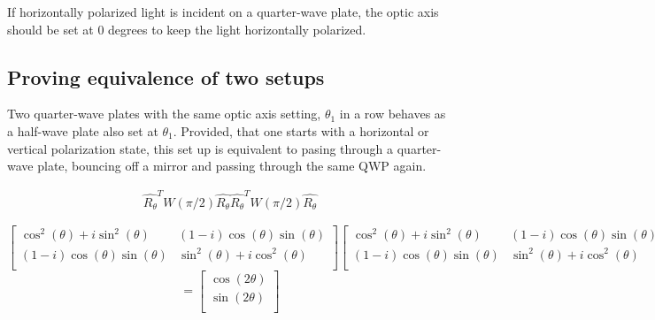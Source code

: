 \documentclass{article}
\begin{document}
\hspace{\parindent} If horizontally polarized light is incident on a quarter-wave plate, the optic axis should be set at 0 degrees to keep the light horizontally polarized. 


\subsection{ Proving equivalence of two setups}

\hspace{\parindent} Two quarter-wave plates with the same optic axis setting, $\theta_{1}$ in a row behaves as a half-wave plate also set at $\theta_{1}$. Provided, that one starts with a horizontal or vertical polarization state, this set up is equivalent to pasing through a quarter-wave plate, bouncing off a mirror and passing through the same QWP again. 




\begin{gather*}
    \hat{R_{\theta}}^{T}W(\pi/2)\hat{R_{\theta}}\hat{R_{\theta}}^{T}W(\pi/2)\hat{R_{\theta}}
\end{gather*}

\[\begin{bmatrix}
\cos^2(\theta)+i\sin^2(\theta)&(1-i)\cos(\theta)\sin(\theta)\\
(1-i)\cos(\theta)\sin(\theta)&\sin^2(\theta)+i\cos^2(\theta)\\
\end{bmatrix}
\begin{bmatrix}
\cos^2(\theta)+i\sin^2(\theta)&(1-i)\cos(\theta)\sin(\theta)\\
(1-i)\cos(\theta)\sin(\theta)&\sin^2(\theta)+i\cos^2(\theta)\\
\end{bmatrix}
\begin{bmatrix}
1\\
0\\
\end{bmatrix}
\]
\[= \begin{bmatrix}
\cos(2\theta)\\
\sin(2\theta)\\
\end{bmatrix}
\]

\vspace{5mm}
\end{document}
